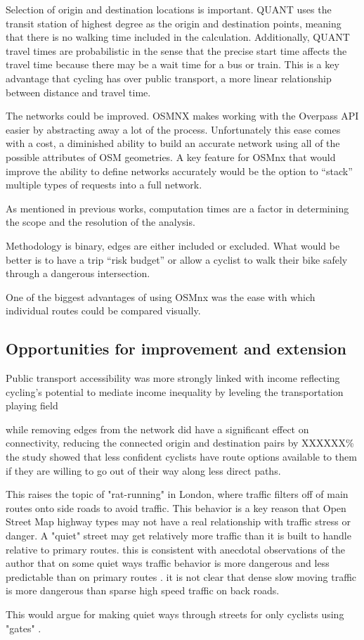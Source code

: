 Selection of origin and destination locations is important. QUANT uses the transit station of highest degree as the origin and destination points, meaning that there is no walking time included in the calculation. Additionally, QUANT travel times are probabilistic in the sense that the precise start time affects the travel time because there may be a wait time for a bus or train. This is a key advantage that cycling has over public transport, a more linear relationship between distance and travel time. 

The networks could be improved. OSMNX makes working with the Overpass API easier by abstracting away a lot of the process. Unfortunately this ease comes with a cost, a diminished ability to build an accurate network using all of the possible attributes of OSM geometries. A key feature for OSMnx that would improve the ability to define networks accurately would be the option to ``stack'' multiple types of requests into a full network.  

As mentioned in previous works, computation times are a factor in determining the scope and the resolution of the analysis. 

Methodology is binary, edges are either included or excluded. What would be better is to have a trip ``risk budget''  or allow a cyclist to walk their bike safely through a dangerous intersection. 

One of the biggest advantages of using OSMnx was the ease with which individual routes could be compared visually. 

\subsection{Opportunities for improvement and extension}

Public transport accessibility was more strongly linked with income reflecting cycling's potential to mediate income inequality by leveling the transportation playing field

while removing edges from the network did have a significant effect on connectivity, reducing the connected origin and destination pairs by XXXXXX\% the study showed that less confident cyclists have route options available to them if they are willing to go out of their way along less direct paths. 


This raises the topic of "rat-running" in London, where traffic filters off of main routes onto side roads to avoid traffic. This behavior is a key reason that Open Street Map highway types may not have a real relationship with traffic stress or danger. A "quiet" street may get relatively more traffic than it is built to handle relative to primary routes. this is consistent with anecdotal observations of the author that on some quiet ways traffic behavior is more dangerous and less predictable than on primary routes . it is not clear that dense slow moving traffic is more dangerous than sparse high speed traffic on back roads. 

This would argue for making quiet ways through streets for only cyclists using "gates" .